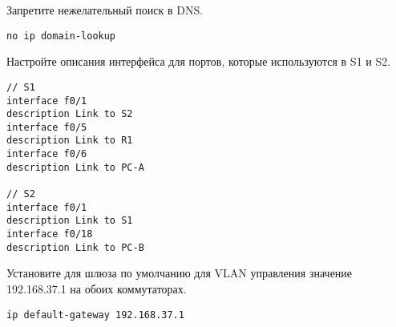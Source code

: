 Запретите нежелательный поиск в DNS.

\begin{verbatim}
no ip domain-lookup
\end{verbatim}

Настройте описания интерфейса для портов, которые используются в S1 и S2.

\begin{verbatim}
// S1
interface f0/1
description Link to S2
interface f0/5
description Link to R1
interface f0/6
description Link to PC-A

// S2
interface f0/1
description Link to S1
interface f0/18
description Link to PC-B
\end{verbatim}

Установите для шлюза по умолчанию для VLAN управления значение 192.168.37.1
на обоих коммутаторах.

\begin{verbatim}
ip default-gateway 192.168.37.1
\end{verbatim}


